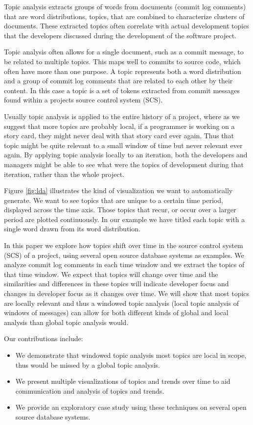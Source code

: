 \documentclass[times, 10pt,twocolumn]{article}
\begin{document}
Topic analysis extracts groups of words from documents (commit log
comments) that are word distributions, topics, that are combined to
characterize clusters of documents. These extracted topics often
correlate with actual development topics that the developers discussed
during the development of the software project.


Topic analysis often allows for a single document, such as a commit
message, to be related to multiple topics. This maps well to commits
to source code, which often have more than one purpose.  A topic
represents both a word distribution and a group of commit log comments
that are related to each other by their content.  In this case a topic
is a set of tokens extracted from commit messages found within a
projects source control system (SCS).



Usually topic analysis is applied to the entire history of a project,
where as we suggest that more topics are probably local, if a
programmer is working on a story card, they might never deal with that
story card ever again. Thus that topic might be quite relevant to a
small window of time but never relevant ever again.  By applying topic
analysis locally to an iteration, both the developers and managers
might be able to see what were the topics of development during that
iteration, rather than the whole project.


Figure \ref{fig:lda} illustrates the kind of visualization we want to
automatically generate. We want to see topics that are unique to a
certain time period, displayed across the time axis. Those topics that
recur, or occur over a larger period are plotted continuously. In our
example we have titled each topic with a single word drawn from its word
distribution.

In this paper we explore how topics shift over time in the source
control system (SCS) of a project, using several open source database
systems as examples. We analyze commit log comments in each time
window and we extract the topics of that time window. We expect that
topics will change over time and the similarities and differences in
these topics will indicate developer focus and changes in developer
focus as it changes over time. We will show that most topics are
locally relevant and thus a windowed topic analysis (local topic
analysis of windows of messages) can allow for both different kinds of
global and local analysis than global topic analysis would.

Our contributions include:
\begin{itemize}
\item We demonstrate that windowed topic analysis most topics are local
  in scope, thus would be missed by a global topic analysis.
\item We present multiple visualizations of topics and trends over time to aid
  communication and analysis of topics and trends.
\item We provide an exploratory case study using these techniques on
  several open source database systems.
\end{itemize}
\end{document}
